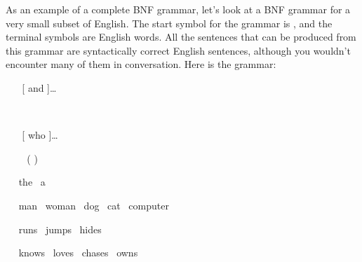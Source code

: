 \medbreak

As an example of a complete BNF grammar, let's look at a BNF grammar for a very small
subset of English.  The start symbol for the grammar
is , and the terminal symbols are English words.
All the sentences that can be produced from this grammar
are syntactically correct English sentences, although you wouldn't
encounter many of them in conversation.  Here is the grammar:

\smallskip

\  \BNFPRODUCES\  [ and  ]\dots
\smallskip

\  \BNFPRODUCES\  
\smallskip

\  \BNFPRODUCES\   [ who  ]\dots
\smallskip

\  \BNFPRODUCES\  \BNFALT\ (   )
\smallskip

\  \BNFPRODUCES\ the \BNFALT\ a
\smallskip

\  \BNFPRODUCES\ man \BNFALT\ woman \BNFALT\ dog  \BNFALT\ cat  \BNFALT\ computer
\smallskip

\  \BNFPRODUCES\ runs \BNFALT\ jumps \BNFALT\ hides
\smallskip

\  \BNFPRODUCES\ knows \BNFALT\ loves \BNFALT\ chases  \BNFALT\ owns

\smallskip

